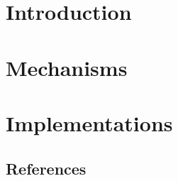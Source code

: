 \documentclass{book}
\begin{document}
\part{Introduction}






%
%








\part{Mechanisms}






\part{Implementations}



\chapter*{References}



\end{document}

